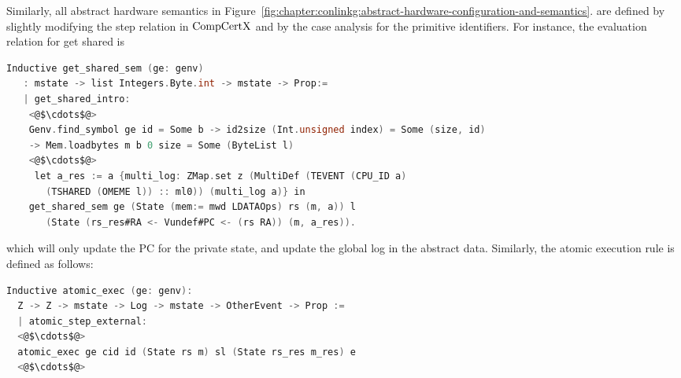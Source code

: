 Similarly, all abstract hardware semantics in  Figure~\ref{fig:chapter:conlinkg:abstract-hardware-configuration-and-semantics}.
are defined 
by slightly modifying the step relation in $\mathrm{CompCertX}$ 
and by the case analysis for the primitive identifiers. 
For instance, the evaluation relation for get shared is
\begin{lstlisting}[language=C]
 Inductive get_shared_sem (ge: genv) 
   : mstate -> list Integers.Byte.int -> mstate -> Prop:=
   | get_shared_intro: 
    <@$\cdots$@>
    Genv.find_symbol ge id = Some b -> id2size (Int.unsigned index) = Some (size, id)
    -> Mem.loadbytes m b 0 size = Some (ByteList l)
    <@$\cdots$@>
     let a_res := a {multi_log: ZMap.set z (MultiDef (TEVENT (CPU_ID a)
       (TSHARED (OMEME l)) :: ml0)) (multi_log a)} in
    get_shared_sem ge (State (mem:= mwd LDATAOps) rs (m, a)) l 
       (State (rs_res#RA <- Vundef#PC <- (rs RA)) (m, a_res)).
\end{lstlisting}
which will only update the PC for the private state,
and update the global log in the abstract data.
Similarly, the atomic execution rule is defined as follows:
\begin{lstlisting}[language=C]
Inductive atomic_exec (ge: genv):
  Z -> Z -> mstate -> Log -> mstate -> OtherEvent -> Prop :=
  | atomic_step_external:
  <@$\cdots$@>
  atomic_exec ge cid id (State rs m) sl (State rs_res m_res) e
  <@$\cdots$@>
\end{lstlisting}

